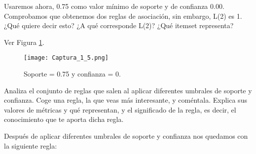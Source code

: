 \documentclass[11pt]{exam}
\begin{document}
\begin{questions}



{\question Usaremos ahora, 0.75 como valor mínimo de soporte y de confianza 0.00. Comprobamos que obtenemos dos reglas de asociación, sin embargo, L(2) es 1. ¿Qué quiere decir esto? ¿A qué corresponde L(2)? ¿Qué itemset representa?}

Ver Figura \ref{Captura_1_5}.

\begin{figure}[h]
	\centering
	\texttt{[image: Captura\_1\_5.png]}
	\caption{Soporte = 0.75 y confianza = 0.}
	\label{Captura_1_5}
\end{figure}

{\question Analiza el conjunto de reglas que salen al aplicar diferentes umbrales de soporte y confianza. Coge una regla, la que veas más interesante, y coméntala. Explica sus valores de métricas y qué representan, y el significado de la regla, es decir, el conocimiento que te aporta dicha regla.}

Después de aplicar diferentes umbrales de soporte y confianza nos quedamos con la siguiente regla:
\end{questions}
\end{document}
